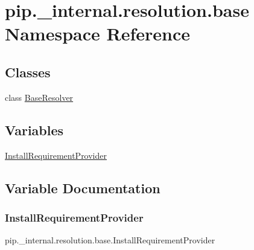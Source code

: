 \hypertarget{namespacepip_1_1__internal_1_1resolution_1_1base}{}\section{pip.\+\_\+internal.\+resolution.\+base Namespace Reference}
\label{namespacepip_1_1__internal_1_1resolution_1_1base}
\subsection*{Classes}
\begin{DoxyCompactItemize}
\item 
class \hyperlink{classpip_1_1__internal_1_1resolution_1_1base_1_1BaseResolver}{Base\+Resolver}
\end{DoxyCompactItemize}
\subsection*{Variables}
\begin{DoxyCompactItemize}
\item 
\hyperlink{namespacepip_1_1__internal_1_1resolution_1_1base_ae93468fbfce11df80bf77594407ba510}{Install\+Requirement\+Provider}
\end{DoxyCompactItemize}


\subsection{Variable Documentation}
\mbox{\label{namespacepip_1_1__internal_1_1resolution_1_1base_ae93468fbfce11df80bf77594407ba510}} 
\subsubsection{\texorpdfstring{Install\+Requirement\+Provider}{InstallRequirementProvider}}
{\footnotesize\ttfamily pip.\+\_\+internal.\+resolution.\+base.\+Install\+Requirement\+Provider}

